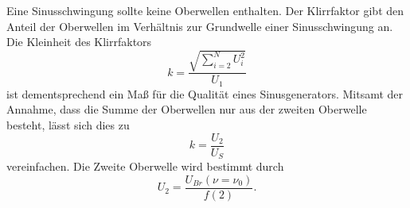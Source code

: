 Eine Sinusschwingung sollte keine Oberwellen enthalten. 
Der Klirrfaktor gibt den Anteil der Oberwellen im Verhältnis zur Grundwelle einer Sinusschwingung an.
Die Kleinheit des Klirrfaktors
\begin{equation}
    k =  \frac{\sqrt{\sum_{i=2}^N U_i^2}}{U_1}
\end{equation}
ist dementsprechend ein Maß für die Qualität eines Sinusgenerators.
Mitsamt der Annahme, dass die Summe der Oberwellen nur aus der zweiten Oberwelle besteht, lässt sich dies zu 
\begin{equation}
    k = \frac{U_2}{U_S}
    \label{eqn:k_einf}
\end{equation}
vereinfachen.
Die Zweite Oberwelle wird bestimmt durch
\begin{equation}
    U_2 = \frac{U_{Br}(\nu = \nu_0)}{f(2)}.
\end{equation}
